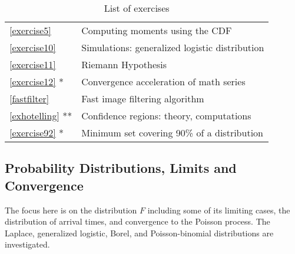 \documentclass[10pt]{article}
\begin{document}
\begin{table}[H]
\begin{minipage}{.5\linewidth}
\begin{tabular}{ll}
   \ref{exercise5} & Computing moments using the CDF\\
   \ref{exercise10} & Simulations: generalized logistic distribution \\
   \ref{exercise11} & Riemann Hypothesis \\
   \ref{exercise12} * & Convergence acceleration of math series\\
   \ref{fastfilter} & Fast image filtering algorithm  \\
   \ref{exhotelling} ** & Confidence regions: theory, computations \\
   \ref{exercise92} * &  Minimum set covering 90\% of a distribution
        \end{tabular}
    \end{minipage}
    \caption{\label{tabex21}List of exercises}

\end{table}




\subsection{Probability Distributions, Limits and Convergence}

The focus here is on the distribution $F$ including some of its  limiting cases, the distribution of arrival times, and convergence to the Poisson process. The Laplace, generalized logistic, Borel, and Poisson-binomial distributions are investigated.
\end{document}
